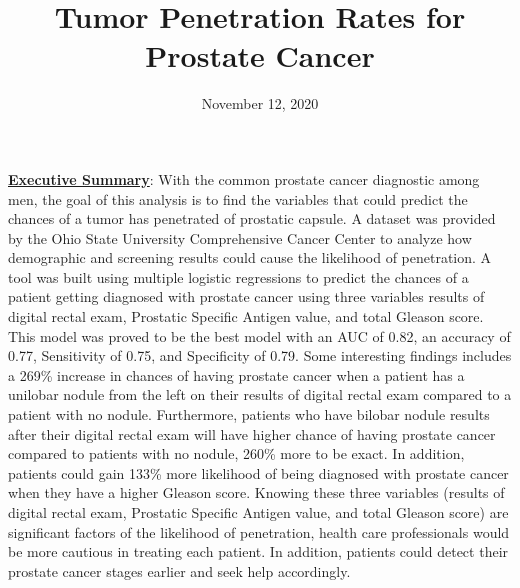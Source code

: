 \documentclass[11pt]{article}\usepackage[]{graphicx}\usepackage[]{color}
\title{Tumor Penetration Rates for Prostate Cancer\vspace{-5ex}}
\date{November 12, 2020\vspace{-5ex}}
\begin{document}
 
\maketitle
\hfill \break


















\noindent\textbf{\underline{Executive Summary}}: With the common prostate cancer diagnostic among men, the goal of this analysis is to find the variables that could predict the chances of a tumor has penetrated of prostatic capsule. A dataset was provided by the Ohio State University Comprehensive Cancer Center to analyze how demographic and screening results could cause the likelihood of penetration. A tool was built using multiple logistic regressions to predict the chances of a patient getting diagnosed with prostate cancer using three variables results of digital rectal exam, Prostatic Specific Antigen value, and total Gleason score. This model was proved to be the best model with an AUC of 0.82, an accuracy of 0.77, Sensitivity of 0.75, and Specificity of 0.79. Some interesting findings includes a 269\% increase in chances of having prostate cancer when a patient has a unilobar nodule from the left on their results of digital rectal exam compared to a patient with no nodule. Furthermore, patients who have bilobar nodule results after their digital rectal exam will have higher chance of having prostate cancer compared to patients with no nodule, 260\% more to be exact. In addition, patients could gain 133\% more likelihood of being diagnosed with prostate cancer when they have a higher Gleason score. Knowing these three variables (results of digital rectal exam, Prostatic Specific Antigen value, and total Gleason score) are significant factors of the likelihood of penetration, health care professionals would be more cautious in treating each patient. In addition, patients could detect their prostate cancer stages earlier and seek help accordingly.      
\hfill \break
\end{document}
